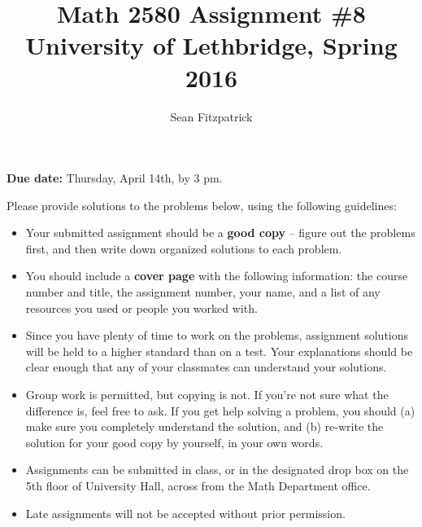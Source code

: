\documentclass[letterpaper,12pt]{article}
\title{Math 2580 Assignment \#8\\University of Lethbridge, Spring 2016}
\author{Sean Fitzpatrick}
\begin{document}
 \maketitle

{\bf Due date:} Thursday, April 14th, by 3 pm.

\bigskip

Please provide solutions to the problems below, using the following guidelines:
\begin{itemize}
\item Your submitted assignment should be a {\bf good copy} -- figure out the problems first, and then write down organized solutions to each problem. 
\item You should include a {\bf cover page} with the following information: the course number and title, the assignment number, your name, and a list of any resources you used or people you worked with.
\item Since you have plenty of time to work on the problems, assignment solutions will be held to a higher standard than on a test. Your explanations should be clear enough that any of your classmates can understand your solutions.
\item Group work is permitted, but copying is not. If you're not sure what the difference is, feel free to ask. If you get help solving a problem, you should (a) make sure you completely understand the solution, and (b) re-write the solution for your good copy by yourself, in your own words.
\item Assignments can be submitted in class, or in the designated drop box on the 5th floor of University Hall, across from the Math Department office.
\item Late assignments will not be accepted without prior permission.

\end{itemize}
\newpage
\end{document}
